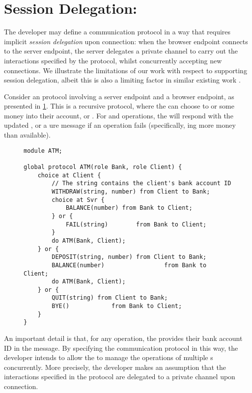 \section{Session Delegation: }
\label{section:evalatm}

The developer may define a communication protocol
in a way that requires implicit \textit{session delegation}
upon connection: when the browser endpoint connects
to the server endpoint, the server delegates a private channel
to carry out the interactions specified by the protocol,
whilst concurrently accepting new connections.
We illustrate the limitations of our work with respect
to supporting session delegation, albeit this is also
a limiting factor in similar existing work 
\cite{PureScript2019,MVU2020}.

Consider an  protocol involving a 
 server endpoint and 
a  browser endpoint,
as presented in \cref{lst:atm}.
This is a recursive protocol, where the 
can choose to  or  some money
into their account, or .
For  and  operations,
the  will respond with the updated ,
or a ure message if an operation fails (specifically,
ing more money than available).

\begin{figure}[!ht]
\begin{lstlisting}[language=Scribble, tabsize=2]
module ATM;

global protocol ATM(role Bank, role Client) {
	choice at Client {
		// The string contains the client's bank account ID
		WITHDRAW(string, number) from Client to Bank;
		choice at Svr {
			BALANCE(number) from Bank to Client;		
		} or {
			FAIL(string) 		from Bank to Client;		
		}
		do ATM(Bank, Client);
	} or {
		DEPOSIT(string, number) from Client to Bank;
		BALANCE(number) 				from Bank to Client;
		do ATM(Bank, Client);
	} or {
		QUIT(string) from Client to Bank;
		BYE() 			 from Bank to Client;	
	}
}
\end{lstlisting}
\label{lst:atm}
\end{figure}

An important detail is that, for any operation,
the  provides their bank account ID
in the message. By specifying the communication protocol
in this way, the developer intends to allow the
 to manage the operations of multiple
s concurrently.
More precisely, the developer makes an assumption
that the interactions specified in the protocol
are delegated to a private channel upon connection.

